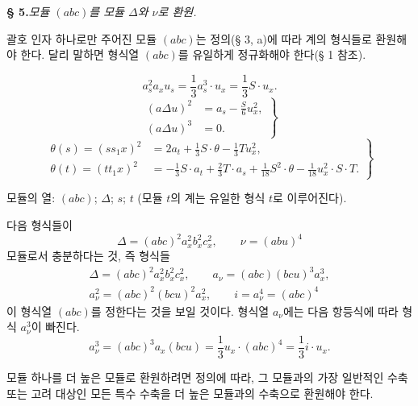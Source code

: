 \begin{center}
\textbf{§ 5.}\quad\emph{모듈 $(abc)$를 모듈 $\Delta$와 $\nu$로 환원.}
\end{center}

괄호 인자 하나로만 주어진 모듈 $(abc)$는 정의(§ 3, a)에 따라 계의 형식들로 환원해야 한다. 달리 말하면 형식열 $(abc)$를 유일하게 정규화해야 한다(§ 1 참조).

\[
a_s^2a_xu_s=\frac13a_s^3\cdot u_x=\frac13S\cdot u_x. \tag{2.}
\]
\[
\left.
\begin{aligned}
(a\Delta u)^2&=a_s-\frac{S}{6}u_x^2,\\
(a\Delta u)^3&=0.
\end{aligned}
\right\} \tag{3.}
\]
\[
\left.
\begin{aligned}
\theta(s)=(ss_1x)^2&=2a_t+\frac13S\cdot\theta-\frac13Tu_x^2,\\
\theta(t)=(tt_1x)^2&=-\frac13S\cdot a_t+\frac23T\cdot a_s+\frac1{18}S^2\cdot\theta-\frac1{18}u_x^2\cdot S\cdot T.
\end{aligned}
\right\} \tag{4.}
\]

모듈의 열: $(abc)$; $\Delta$; $s$; $t$ (모듈 $t$의 계는 유일한 형식 $t$로 이루어진다).

다음 형식들이
\[
\Delta=(abc)^2a_x^2b_x^2c_x^2,\qquad \nu=(abu)^4
\]
모듈로서 충분하다는 것, 즉 형식들
\[
\begin{gathered}
\Delta=(abc)^2a_x^2b_x^2c_x^2,
\qquad a_\nu=(abc)(bcu)^3a_x^3,\\
a_\nu^2=(abc)^2(bcu)^2a_x^2,
\qquad i=a_\nu^4=(abc)^4
\end{gathered}
\]
이 형식열 $(abc)$를 정한다는 것을 보일 것이다. 형식열 $a_\nu$에는 다음 항등식에 따라 형식 $a_\nu^3$이 빠진다.
\[
a_\nu^3=(abc)^3a_x(bcu)=\frac13u_x\cdot(abc)^4=\frac13i\cdot u_x.
\]

모듈 하나를 더 높은 모듈로 환원하려면 정의에 따라, 그 모듈과의 가장 일반적인 수축 또는 고려 대상인 모든 특수 수축을 더 높은 모듈과의 수축으로 환원해야 한다.

